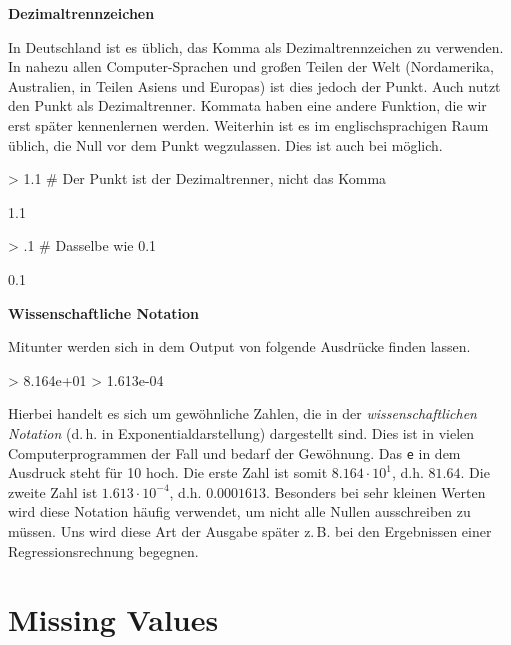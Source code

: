 \textbf{Dezimaltrennzeichen} 

In Deutschland ist es üblich, das Komma als Dezimaltrennzeichen zu verwenden. In nahezu allen Computer-Sprachen und großen Teilen der Welt (Nordamerika, Australien, in Teilen Asiens und Europas) ist dies jedoch der Punkt. Auch \R{} nutzt den Punkt als Dezimaltrenner. Kommata haben eine andere Funktion, die wir erst später kennenlernen werden. Weiterhin ist es im englischsprachigen Raum üblich, die Null vor dem Punkt wegzulassen. Dies ist auch bei \R{} möglich.

\begin{Schunk}
\begin{Sinput}
> 1.1     # Der Punkt ist der Dezimaltrenner, nicht das Komma
\end{Sinput}
\begin{Soutput}
[1] 1.1
\end{Soutput}
\begin{Sinput}
> .1      # Dasselbe wie 0.1
\end{Sinput}
\begin{Soutput}
[1] 0.1
\end{Soutput}
\end{Schunk}


\par
\textbf{Wissenschaftliche Notation} 

Mitunter werden sich in dem Output von \R{} folgende Ausdrücke finden lassen. 

\begin{Schunk}
\begin{Sinput}
> 8.164e+01              
> 1.613e-04
\end{Sinput}
\end{Schunk}

Hierbei handelt es sich um gewöhnliche Zahlen, die in der \emph{wissenschaftlichen Notation} (d.\,h. in Exponentialdarstellung) dargestellt sind. Dies ist in vielen Computerprogrammen der Fall und bedarf der Gewöhnung. Das \verb!e! in dem Ausdruck steht für 10 hoch. Die erste Zahl ist somit $8.164 \cdot 10^1$, d.h. $81.64$. Die zweite Zahl ist $1.613 \cdot 10^{-4}$, d.h. $0.0001613$. Besonders bei sehr kleinen Werten wird diese Notation häufig verwendet, um nicht alle Nullen ausschreiben zu müssen. Uns wird diese Art der Ausgabe später z.\,B. bei den Ergebnissen einer Regressionsrechnung begegnen. 
                                                                                   


\section{Missing Values}      

